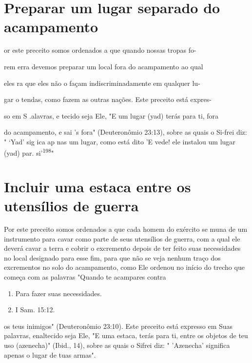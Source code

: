 \begin{itemize}
\begin{enumrate}
\begin{itemize}
\begin{itemize}
\begin{itemize}
\section{Preparar um lugar separado do acampamento}


or este preceito somos ordenados a que quando nossas tropas fo-


rem erra devemos preparar um local fora do acampamento ao qual

eles ra que eles não o façam indiscriminadamente em qualquer lu-

gar o tendas, como fazem as outras nações. Este preceito está expres-

so em S .alavras, e tecido seja Ele, "E um lugar (yad) terás para ti,
fora

do acampamento, e sai 's fora" (Deuteronômio 23:13), sobre as quais o
Si-frei diz: " `Yad' sig ica ap nas um lugar, como está dito 'E vede!
ele instalou um lugar (yad) par. si'\textsuperscript{198}"

\section{Incluir uma estaca entre os utensílios de guerra}

Por este preceito somos ordenados a que cada homem do exército se muna
de um instrumento para cavar como parte de seus utensílios de guer­ra,
com a qual ele deverá cavar a terra e cobrir o excremento depois de ter
feito suas necessidades no local designado para esse fim, para que não
se veja ne­nhum traço dos excrementos no solo do acampamento, como Ele
ordenou no início do trecho que começa com as palavras "Quando te
acampares contra


\begin{enumerate}
\def\labelenumi{\arabic{enumi}.}
\setcounter{enumi}{196}
\item
 
 Para fazer suas necessidades.
 
\item
 
 I Sam. 15:12.
 
\end{enumerate}




os teus inimigos" (Deuteronômio 23:10). Este preceito está expresso em
Suas palavras, enaltecido seja Ele, "E uma estaca, terás para ti, entre
os objetos de teu uso (azenecha)" (Ibid., 14), sobre as quais o Sifrei
diz: " 'Azenecha' signifi­ca apenas o lugar de tuas armas".


\end{itemize}
\end{itemize}
\end{itemize}
\end{enumrate}
\end{itemize}
